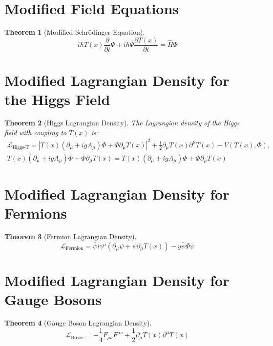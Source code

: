 \documentclass[12pt,a4paper]{article}
\newcommand{\Tfield}{T(x)}
\newcommand{\DhiggsT}{\Tfield (\partial_\mu + ig A_\mu) \Phi + \Phi \partial_\mu \Tfield}
\newtheorem{theorem}{Theorem}[section]
\theoremstyle{definition}
\theoremstyle{remark}
\begin{document}
	\section{Modified Field Equations}
	\begin{theorem}[Modified Schrödinger Equation]
		\begin{equation}
			i\hbar \Tfield \frac{\partial}{\partial t} \Psi + i\hbar \Psi \frac{\partial \Tfield}{\partial t} = \hat{H} \Psi
		\end{equation}
	\end{theorem}
	
	\section{Modified Lagrangian Density for the Higgs Field}
	\begin{theorem}[Higgs Lagrangian Density]
		The Lagrangian density of the Higgs field with coupling to \(\Tfield\) is:
		\begin{multline}
			\mathcal{L}_{\text{Higgs-T}} = |\DhiggsT|^2 + \frac{1}{2} \partial_\mu \Tfield \partial^\mu \Tfield - V(\Tfield, \Phi), \quad \\
			\DhiggsT = \Tfield (\partial_\mu + ig A_\mu) \Phi + \Phi \partial_\mu \Tfield
		\end{multline}
	\end{theorem}
	
	\section{Modified Lagrangian Density for Fermions}
	\begin{theorem}[Fermion Lagrangian Density]
		\begin{equation}
			\mathcal{L}_{\text{Fermion}} = \bar{\psi} i \gamma^\mu (\partial_\mu \psi + \psi \partial_\mu \Tfield) - y \bar{\psi} \Phi \psi
		\end{equation}
	\end{theorem}
	
	\section{Modified Lagrangian Density for Gauge Bosons}
	\begin{theorem}[Gauge Boson Lagrangian Density]
		\begin{equation}
			\mathcal{L}_{\text{Boson}} = -\frac{1}{4} F_{\mu\nu} F^{\mu\nu} + \frac{1}{2} \partial_\mu \Tfield \partial^\mu \Tfield
		\end{equation}
	\end{theorem}
	
\end{document}
